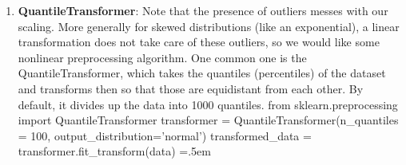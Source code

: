 \documentclass{article}
\newenvironment{cverbatim}
 {\SaveVerbatim{cverb}}
 {\endSaveVerbatim
  \flushleft\fboxrule=0pt\fboxsep=.5em
  \colorbox{cverbbg}{%
    \makebox[\dimexpr\linewidth-2\fboxsep][l]{\BUseVerbatim{cverb}}%
  }
  \endflushleft
}
\theoremstyle{definition}
\theoremstyle{remark}
\theoremstyle{definition}
\begin{document}
\begin{enumerate}
    \item \textbf{QuantileTransformer}: Note that the presence of outliers messes with our scaling. More generally for skewed distributions (like an exponential), a linear transformation does not take care of these outliers, so we would like some nonlinear preprocessing algorithm. One common one is the QuantileTransformer, which takes the quantiles (percentiles) of the dataset and transforms then so that those are equidistant from each other. By default, it divides up the data into 1000 quantiles. 
    \begin{cverbatim}
    from sklearn.preprocessing import QuantileTransformer
    transformer = QuantileTransformer(n_quantiles = 100, output_distribution='normal')
    transformed_data = transformer.fit_transform(data)
    \end{cverbatim}
\end{enumerate}
\end{document}
